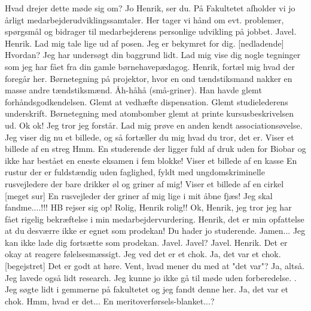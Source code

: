 \documentclass[a4paper,12pt]{article}
\begin{document}
\begin{sketch}
 Hvad drejer dette møde sig om?
 Jo Henrik, ser du. På Fakultetet afholder vi jo årligt medarbejderudviklingssamtaler. Her tager vi hånd om evt. problemer, spørgsmål og bidrager til medarbejderens personlige udvikling på jobbet.
 Javel.
 Henrik. Lad mig tale lige ud af posen. Jeg er bekymret for dig.
[nedladende] Hvordan?
 Jeg har undersøgt din baggrund lidt. Lad mig vise dig nogle tegninger som jeg har fået fra din gamle børnehavepædagog.
 Henrik, fortæl mig hvad der foregår her.
Børnetegning på projektor, hvor en ond tændstiksmand nakker en masse andre tændstiksmænd.
 Åh-håhå (små-griner). Han havde glemt forhåndsgodkendelsen.
 Glemt at vedhæfte dispensation.
 Glemt studielederens underskrift.
Børnetegning med atombomber
 glemt at printe kursusbeskrivelsen ud.
 Ok ok! Jeg tror jeg forstår. Lad mig prøve en anden kendt associationsøvelse. Jeg viser dig nu et billede, og så fortæller du mig hvad du tror, det er.
Viser et billede af en streg
 Hmm. En studerende der ligger fuld af druk uden for Biobar og ikke har bestået en eneste eksamen i fem blokke!
Viser et billede af en kasse
 En rustur der er fuldstændig uden faglighed, fyldt med ungdomskriminelle rusvejledere der bare drikker øl og griner af mig!
Viser et billede af en cirkel
[meget sur] En rusvejleder der griner af mig lige i mit åbne fjæs! Jeg skal fandme....!!! \scene HB rejser sig op!
 Rolig, Henrik rolig!! 
 Ok, Henrik, jeg tror jeg har fået rigelig bekræftelse i min medarbejdervurdering. Henrik, det er min opfattelse at du desværre ikke er egnet som prodekan! Du hader jo studerende.
 Jamen...
 Jeg kan ikke lade dig fortsætte som prodekan.
 Javel.
 Javel?
 Javel.
 Henrik. Det er okay at reagere følelsesmæssigt. Jeg ved det er et chok.
 Ja, det var et chok.
[begejstret] Det er godt at høre. Vent, hvad mener du med at "det var"?
 Ja, altså.  Jeg lavede også lidt research. Jeg kunne jo ikke gå til møde uden forberedelse. .
 Jeg søgte lidt i gemmerne på fakultetet og jeg fandt denne her. Ja, det var et chok.
 Hmm, hvad er det... En meritoverførsels-blanket...? 

\end{sketch}
\end{document}
